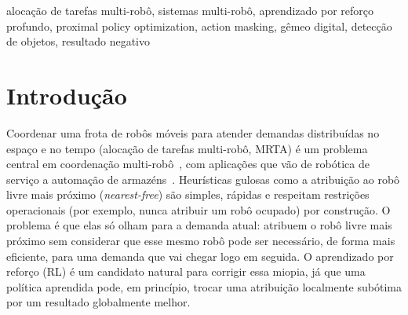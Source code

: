 \documentclass[conference]{IEEEtran}
\begin{document}
\begin{abstract}
A alocação de tarefas multi-robô (MRTA) costuma ser resolvida com heurísticas gulosas, rápidas mas incapazes de antecipar demandas futuras. Treinamos um agente de aprendizado por reforço (RL, Proximal Policy Optimization, PPO) para essa tarefa, com observações baseadas em um gêmeo digital por câmera: uma câmera overhead e um detector YOLOv8n localizam uma frota de robôs TurtleBot3 com erro médio de rastreamento de 4,7 cm (mAP@0.5 = 0,995), substituindo a odometria bruta como fonte de posição da política de alocação. Comparamos o PPO contra a heurística gulosa \textit{nearest-free} usando testes estatísticos pareados rigorosos sobre 1000 episódios. Contrariando nossa hipótese, o PPO não superou o nearest-free: o tempo médio de resposta ficou cerca de 12\% pior, uma diferença estatisticamente significativa. Descobrimos que o PPO atribui tarefas a robôs ocupados em 4,0\% das decisões, contra 0,3\% do nearest-free (13 vezes mais), sugerindo que a penalidade de treino não bastou para ensinar essa restrição. Testamos essa hipótese causalmente com \textit{action masking}, que impede estruturalmente a política de escolher robôs ocupados: a taxa de atribuição inválida caiu para exatamente 0\%, mas o tempo de resposta continuou cerca de 11\% pior que o nearest-free. A violação de restrição, portanto, não é a causa dominante do gap. Reportamos esse resultado negativo e o diagnóstico de sua causa-raiz com rigor estatístico completo, argumentando que uma hipótese refutada, testada de forma transparente, é mais valiosa do que uma alegação positiva incompleta.
\end{abstract}

\begin{IEEEkeywords}
alocação de tarefas multi-robô, sistemas multi-robô, aprendizado por reforço profundo, proximal policy optimization, action masking, gêmeo digital, detecção de objetos, resultado negativo
\end{IEEEkeywords}

\section{Introdução}

Coordenar uma frota de robôs móveis para atender demandas distribuídas no espaço e no tempo (alocação de tarefas multi-robô, MRTA) é um problema central em coordenação multi-robô~\cite{gerkey2004formal}, com aplicações que vão de robótica de serviço a automação de armazéns~\cite{agrawal2022dcmrta,pal2025together}. Heurísticas gulosas como a atribuição ao robô livre mais próximo (\textit{nearest-free}) são simples, rápidas e respeitam restrições operacionais (por exemplo, nunca atribuir um robô ocupado) por construção. O problema é que elas só olham para a demanda atual: atribuem o robô livre mais próximo sem considerar que esse mesmo robô pode ser necessário, de forma mais eficiente, para uma demanda que vai chegar logo em seguida. O aprendizado por reforço (RL) é um candidato natural para corrigir essa miopia, já que uma política aprendida pode, em princípio, trocar uma atribuição localmente subótima por um resultado globalmente melhor.
\end{document}
